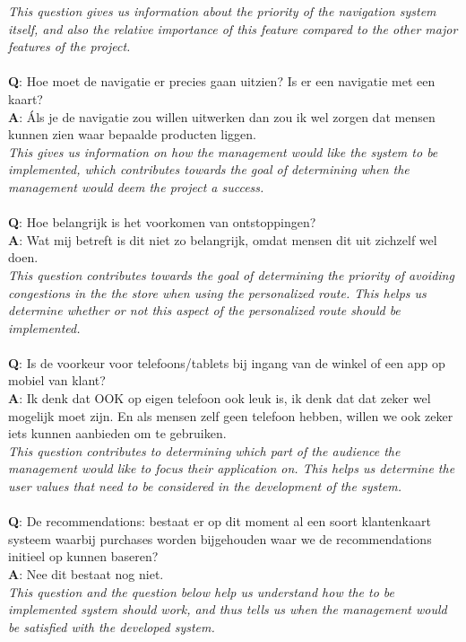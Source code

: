 \documentclass[a4paper]{article}
\begin{document}
\textit{This question gives us information about the priority of the navigation system itself, and also the relative importance of this feature compared to the other major features of the project.}\\
\\
\textbf{Q}: Hoe moet de navigatie er precies gaan uitzien? Is er een navigatie met een kaart?\\
\textbf{A}: Áls je de navigatie zou willen uitwerken dan zou ik wel zorgen dat mensen kunnen zien waar bepaalde producten liggen.\\
\textit{This gives us information on how the management would like the system to be implemented, which contributes towards the goal of determining when the management would deem the project a success.\\}
\\
\textbf{Q}: Hoe belangrijk is het voorkomen van ontstoppingen?\\
\textbf{A}: Wat mij betreft is dit niet zo belangrijk, omdat mensen dit uit zichzelf wel doen.\\
\textit{This question contributes towards the goal of determining the priority of avoiding congestions in the the store when using the personalized route. This helps us determine whether or not this aspect of the personalized route should be implemented.}\\
\\
\textbf{Q}: Is de voorkeur voor telefoons/tablets bij ingang van de winkel of een app op mobiel van klant?\\
\textbf{A}: Ik denk dat OOK op eigen telefoon ook leuk is, ik denk dat dat zeker wel mogelijk moet zijn. En als mensen zelf geen telefoon hebben, willen we ook zeker iets kunnen aanbieden om te gebruiken.\\
\textit{This question contributes to determining which part of the audience the management would like to focus their application on. This helps us determine the user values that need to be considered in the development of the system.}\\
\\
\textbf{Q}: De recommendations: bestaat er op dit moment al een soort klantenkaart systeem waarbij purchases worden bijgehouden waar we de recommendations initieel op kunnen baseren?\\
\textbf{A}: Nee dit bestaat nog niet.\\
\textit{This question and the question below help us understand how the to be implemented system should work, and thus tells us when the management would be satisfied with the developed system.}\\
\end{document}
